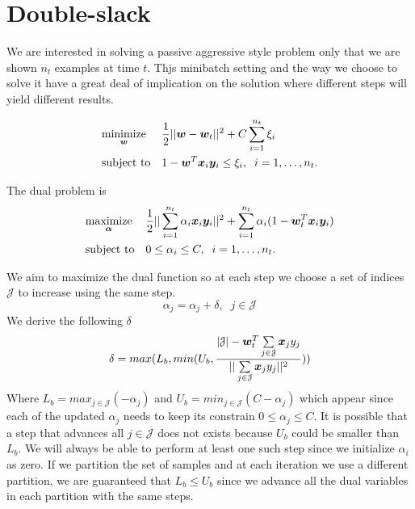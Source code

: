 \section{Double-slack}

We are interested in solving a passive aggressive style problem only that we are shown $n_t$ examples at time $t$. Thjs minibatch setting and the way we choose to solve it have a great deal of implication on the solution where different steps will yield different results.

\begin{equation*}
\begin{aligned}
& \underset{\bm{w}}{\text{minimize}}
& & \frac{1}{2} || \bm{w} - \bm{w}_t ||^2 + C \sum\limits_{i=1}^{n_t}{\xi_i} \\
& \text{subject to}
& & 1 - \bm{w}^T \bm{x}_i \bm{y}_i \leq \xi_i, \;
 \; i = 1, \ldots, n_t.
\end{aligned}
\end{equation*}


The dual problem is 
\begin{equation*}
\begin{aligned}
& \underset{\bm{\alpha}}{\text{maximize}}
& & \frac{1}{2} || \sum\limits_{i=1}^{n_t} {\alpha_i \bm{x}_i \bm{y}_i}||^2 + \sum\limits_{i=1}^{n_t} {\alpha_i (1 - \bm{w}_t^T \bm{x}_i \bm{y}_i }) \\
& \text{subject to}
& & 0 \leq \alpha_i \leq C, \;
 \; i = 1, \ldots, n_t.
\end{aligned}
\end{equation*}


We aim to maximize the dual function so at each step we choose a set of indices $\mathcal{J} $ to increase using the same step.
\[ \alpha_j = \alpha_j + \delta , \;\; j \in \mathcal{J} \]
We derive the following $\delta$
\[ \delta = max(L_b   , min(U_b , \frac{|\mathcal{J}| - \bm{w}_t^T \sum\limits_{j \in \mathcal{J}} {\bm{x}_j y_j}   }{|| \sum\limits_{j \in \mathcal{J} }{\bm{x}_j y_j} ||^2 }  ) )
\]
Where $ L_b = max_{ j \in \mathcal{J} } (-\alpha_j) $ and $ U_b = min_{ j \in \mathcal{J} } (C -\alpha_j) $ which appear since each of the updated $\alpha_j$ needs to keep its constrain $0 \leq \alpha_j \leq C $.
It is possible that a step that advances all $j \in \mathcal{J} $ does not exists because $ U_b $ could be smaller than $L_b$. We will always be able to perform at least one such step since we initialize $\alpha_i$ as zero. If we partition the set of samples and at each iteration we use a different partition, we are guaranteed that $L_b \leq U_b $ since we advance all the dual variables in each partition with the same steps.\\



